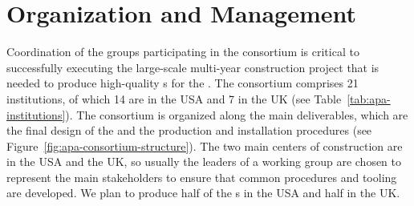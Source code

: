 \section{Organization and Management}
\label{sec:fdsp-apa-org}

Coordination of the groups participating in the   consortium is critical to successfully executing the large-scale multi-year construction project that is needed to produce high-quality s for the  .   The  consortium comprises \num{21} institutions, of which \num{14} are in the USA and \num{7} in the UK (see Table~\ref{tab:apa-institutions}). The consortium is organized along the main deliverables, which are the final design of the  and the  production and installation procedures (see Figure~\ref{fig:apa-consortium-structure}).  The two main centers of  construction are in the USA and the UK, so usually the leaders of a working group are chosen to represent the main stakeholders to ensure that common procedures and tooling are developed.  We plan to produce half of the  s in the USA and half in the UK. 

